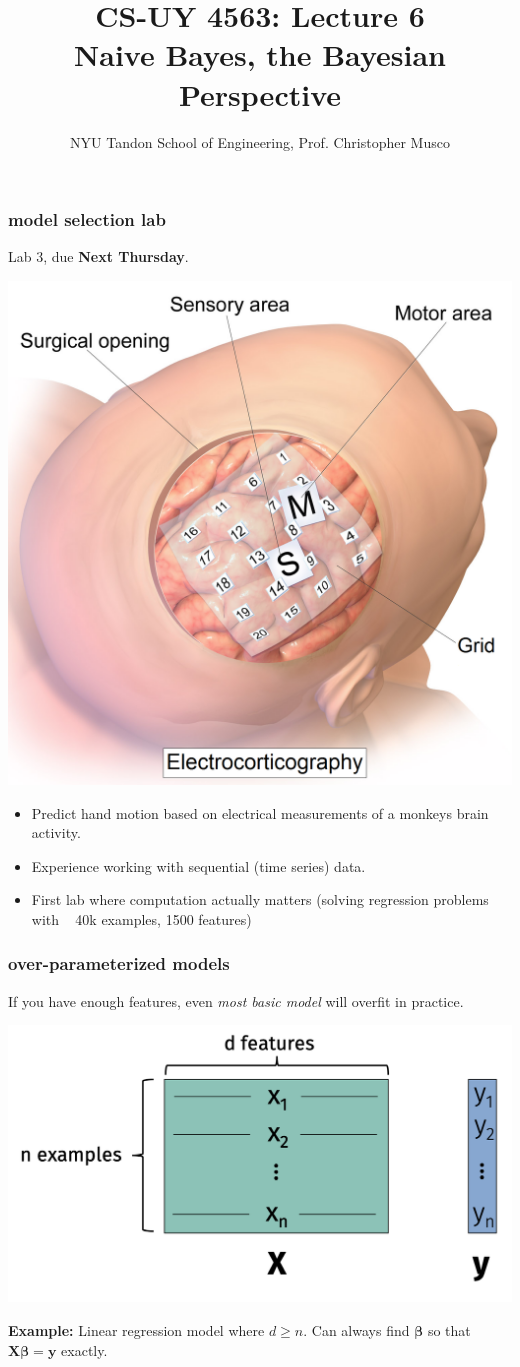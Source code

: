 \documentclass[handout,compress]{beamer}
\title{CS-UY 4563: Lecture 6 \\ Naive Bayes, the Bayesian Perspective}
\author{NYU Tandon School of Engineering, Prof. Christopher Musco}
\date{}
\newcommand{\bs}[1]{\boldsymbol{#1}}
\newcommand{\bv}[1]{\mathbf{#1}}
\begin{document}
\begin{frame}
	\titlepage 
\end{frame}

\begin{frame}[t]
	\frametitle{model selection lab}
	Lab 3, due \textbf{Next Thursday}.
	\begin{center}
		\includegraphics[width=.3\textwidth]{eocg.png}
	\end{center}
	\begin{itemize}
		\item Predict hand motion based on electrical measurements of a monkeys brain activity.
		\item Experience working with sequential (time series) data.
		\item First lab where computation actually matters (solving regression problems with ~ 40k examples, 1500 features)
	\end{itemize} 
\end{frame}

\begin{frame}
	\frametitle{over-parameterized models}
	\begin{center}
		If you have enough features, even \emph{most basic model} will overfit in practice.
		
		\includegraphics[width=.5\textwidth]{overparameterized.png}
		
		\textbf{Example:} Linear regression model where $d \geq n$. Can always find $\bs{\beta}$ so that $\bv{X}\bs{\beta} = \bv{y}$ exactly. 
	\end{center}
\end{frame}
\end{document}
